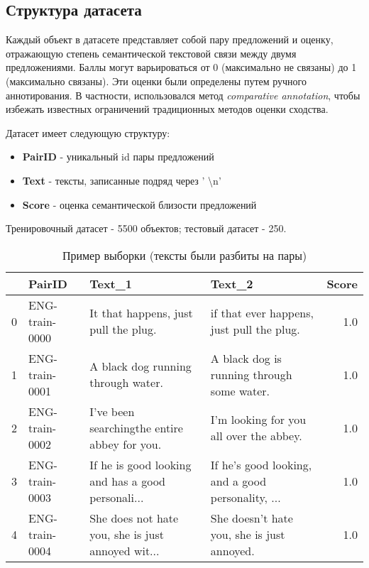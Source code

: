 \documentclass[12pt]{article}
\begin{document}
\subsection{Структура датасета}
Каждый объект в датасете представляет собой пару предложений и оценку, отражающую степень семантической текстовой связи между двумя предложениями. Баллы могут варьироваться от 0 (максимально не связаны) до 1 (максимально связаны). Эти оценки были определены путем ручного аннотирования. В частности, использовался метод \textit{comparative annotation}, чтобы избежать известных ограничений традиционных методов оценки сходства.

Датасет имеет следующую структуру:
\begin{itemize}
    \item \textbf{PairID} - уникальный id пары предложений
    \item \textbf{Text} - тексты, записанные подряд через ' \textbackslash n'
    \item \textbf{Score} - оценка семантической близости предложений
\end{itemize}

Тренировочный датасет - 5500 объектов; тестовый датасет - 250.

\begin{table}[H]
\center
\tiny
\begin{tabular}{llllr}
\hline
{} &          PairID &                                             Text\_1 &                                             Text\_2 &  Score \\
\hline
0 &  ENG-train-0000 &               It that happens, just pull the plug. &          if that ever happens, just pull the plug. &    1.0 \\
1 &  ENG-train-0001 &                 A black dog running through water. &         A black dog is running through some water. &    1.0 \\
2 &  ENG-train-0002 &       I've been searchingthe entire abbey for you. &            I'm looking for you all over the abbey. &    1.0 \\
3 &  ENG-train-0003 &  If he is good looking and has a good personali... &  If he's good looking, and a good personality, ... &    1.0 \\
4 &  ENG-train-0004 &  She does not hate you, she is just annoyed wit... &         She doesn't hate you, she is just annoyed. &    1.0 \\
\hline
\end{tabular}
\caption{Пример выборки (тексты были разбиты на пары)}
\end{table}
\end{document}
